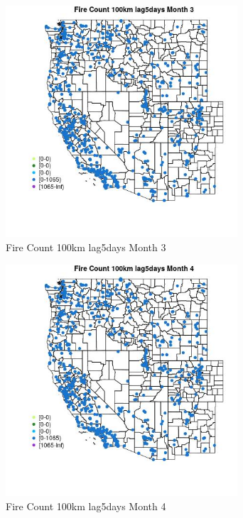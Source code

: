 \begin{figure} 
\centering  
\includegraphics[width=0.77\textwidth]{Code_Outputs/Report_ML_input_PM25_Step4_part_f_de_duplicated_aveswNAs_MapObsMo3Fire_Count_100km_lag5days.jpg} 
\caption{\label{fig:Report_ML_input_PM25_Step4_part_f_de_duplicated_aveswNAsMapObsMo3Fire_Count_100km_lag5days}Fire Count 100km lag5days Month 3} 
\end{figure} 
 

\clearpage 

\begin{figure} 
\centering  
\includegraphics[width=0.77\textwidth]{Code_Outputs/Report_ML_input_PM25_Step4_part_f_de_duplicated_aveswNAs_MapObsMo4Fire_Count_100km_lag5days.jpg} 
\caption{\label{fig:Report_ML_input_PM25_Step4_part_f_de_duplicated_aveswNAsMapObsMo4Fire_Count_100km_lag5days}Fire Count 100km lag5days Month 4} 
\end{figure} 
 

